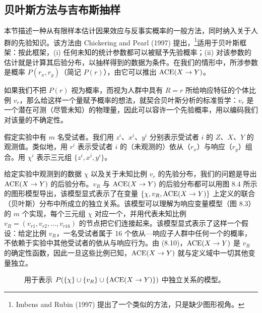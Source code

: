 \subsection{贝叶斯方法与吉布斯抽样}

本节描述一种从有限样本估计因果效应与反事实概率的一般方法，同时纳入关于人群的先验知识。该方法由 Chickering and Pearl (1997) 提出，\footnote{Imbens and Rubin (1997) 提出了一个类似的方法，只是缺少图形视角。}适用于贝叶斯框架：按此框架，(i) 任何未知的统计参数都可以被赋予先验概率；(ii) 对该参数的估计就是计算其后验分布，以抽样得到的数据为条件。在我们的情形中，所涉参数是概率 $P(r_x,r_y)$（简记 $P(r)$），由它可以推出 $\mathrm{ACE}(X\to Y)$。

如果我们不把 $P(r)$ 视为概率，而视为人群中具有 $R=r$ 所给响应特征的个体比例 $v_r$，那么给这样一个量赋予概率的想法，就契合贝叶斯分析的标准哲学：$v_r$ 是一个潜在可测（尽管未知）的物理量，因此可以容许一个先验概率，用以编码我们对该量的不确定性。

假定实验中有 $m$ 名受试者。我们用 $z^i$、$x^i$、$y^i$ 分别表示受试者 $i$ 的 $Z$、$X$、$Y$ 的观测值。类似地，用 $r^i$ 表示受试者 $i$ 的（未观测的）依从（$r_x$）与响应（$r_y$）组合。用 $\chi^i$ 表示三元组 $\{z^i,x^i,y^i\}$。

给定实验中观测到的数据 $\chi$ 以及关于未知比例 $v_r$ 的先验分布，我们的问题是导出 $\mathrm{ACE}(X\to Y)$ 的后验分布。$v_R$ 与 $\mathrm{ACE}(X\to Y)$ 的后验分布都可以用图 8.4 所示的图形模型导出，该模型显式表示了在变量 $\{\chi,v_R,\mathrm{ACE}(X\to Y)\}$ 上定义的联合（贝叶斯）分布中所成立的独立关系。该模型可以理解为响应变量模型（图 8.3）的 $m$ 个实现，每个三元组 $\chi$ 对应一个，并用代表未知比例 $v_R=(v_{r1},v_{r2},\dots,v_{r16})$ 的节点把它们连接起来。该模型显式表示了这样一个假设：给定比例 $v_R$，一名受试者属于 16 个依从—响应子人群中任何一个的概率，不依赖于实验中其他受试者的依从与响应行为。由 \textup{(8.10)}，$\mathrm{ACE}(X\to Y)$ 是 $v_R$ 的确定性函数，因此一旦这些比例已知，$\mathrm{ACE}(X\to Y)$ 就与定义域中一切其他变量独立。

\begin{figure}[htbp]
\centering
{}
\caption{用于表示 $P(\{\chi\}\cup\{v_R\}\cup\{\mathrm{ACE}(X\to Y)\})$ 中独立关系的模型。}
\label{fig:8.4}
\end{figure}

